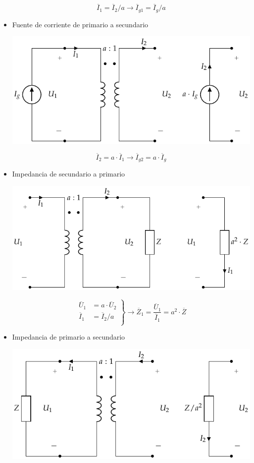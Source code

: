 \begin{itemize}
  \[
    \overline{I}_1 = \overline{I}_2 / a \rightarrow
    \boxed{\overline{I}_{g1} = \overline{I}_g / a}
  \]
\item Fuente de corriente de primario a secundario
  \begin{center}
    \includegraphics[height=.2\textheight]{../figs/TrafoIdeal_IPrim.pdf}
  \end{center}
  \[
    \overline{I}_2 = a \cdot \overline{I}_1 \rightarrow
    \boxed{\overline{I}_{g2} = a \cdot \overline{I}_g}
  \]
\item Impedancia de secundario a primario
  \begin{center}
    \includegraphics[height=.2\textheight]{../figs/TrafoIdeal_ZSec.pdf}
  \end{center}
  \[
    \left.
      \begin{array}{ll}
        \overline{U}_1 &= a \cdot \overline{U}_2\\
        \overline{I}_1 &= \overline{I}_2 / a\\
      \end{array}\right\}
    \rightarrow \boxed{\overline{Z}_1 =
      \frac{\overline{U}_1}{\overline{I}_1} = a^2 \cdot \overline{Z}}
  \]
\item Impedancia de primario a secundario
  \begin{center}
    \includegraphics[height=.2\textheight]{../figs/TrafoIdeal_ZPrim.pdf}

\end{center}
\end{itemize}
